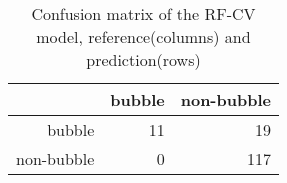 \begin{table}[ht]
\centering
\begin{tabular}{rrr}
  \hline
 & bubble & non-bubble \\ 
  \hline
bubble &  11 &  19 \\ 
  non-bubble &   0 & 117 \\ 
   \hline
\end{tabular}
\caption{Confusion matrix of the RF-CV model, reference(columns) and prediction(rows)} 
\label{tab:cfm}
\end{table}
